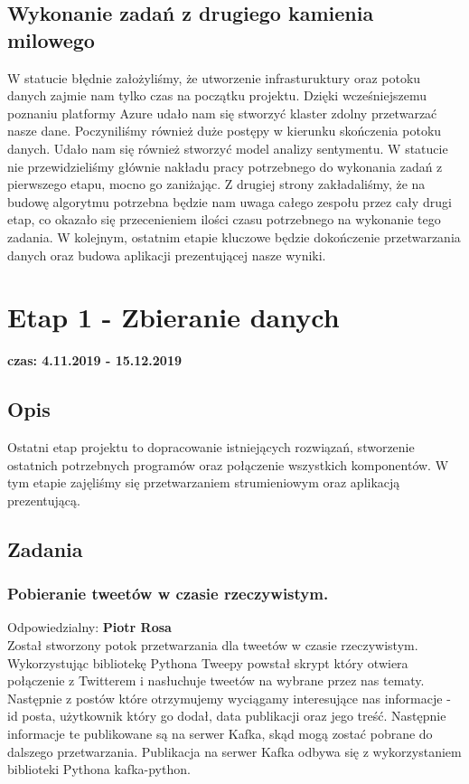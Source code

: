 \documentclass[a4paper,11pt, notitlepage ]{article}
\begin{document}
\subsection{Wykonanie zadań z drugiego kamienia milowego}
W statucie błędnie założyliśmy, że utworzenie infrasturuktury oraz potoku danych zajmie nam tylko czas na początku projektu. Dzięki wcześniejszemu poznaniu platformy Azure udało nam się stworzyć klaster zdolny przetwarzać nasze dane. Poczyniliśmy również duże postępy w kierunku skończenia potoku danych. Udało nam się również stworzyć model analizy sentymentu. W statucie nie przewidzieliśmy głównie nakładu pracy potrzebnego do wykonania zadań z pierwszego etapu, mocno go zaniżając. Z drugiej strony zakładaliśmy, że na budowę algorytmu potrzebna będzie nam uwaga całego zespołu przez cały drugi etap, co okazało się przecenieniem ilości czasu potrzebnego na wykonanie tego zadania. W kolejnym, ostatnim etapie kluczowe będzie dokończenie przetwarzania danych oraz budowa aplikacji prezentującej nasze wyniki.

\section{Etap 1 - Zbieranie danych}
\textbf{czas: 4.11.2019 - 15.12.2019}
\subsection{Opis}
Ostatni etap projektu to dopracowanie istniejących rozwiązań, stworzenie ostatnich potrzebnych programów oraz połączenie wszystkich komponentów. W tym etapie zajęliśmy się przetwarzaniem strumieniowym oraz aplikacją prezentującą.
\subsection{Zadania}
    \subsubsection{Pobieranie tweetów w czasie rzeczywistym.}
    Odpowiedzialny: \textbf{Piotr Rosa}\\
    Został stworzony potok przetwarzania dla tweetów w czasie rzeczywistym. 
    Wykorzystując bibliotekę Pythona Tweepy powstał skrypt który otwiera połączenie z Twitterem i nasłuchuje tweetów na wybrane przez nas tematy. Następnie z postów które otrzymujemy wyciągamy interesujące nas informacje - id posta, użytkownik który go dodał, data publikacji oraz jego treść. Następnie informacje te publikowane są na serwer Kafka, skąd mogą zostać pobrane do dalszego przetwarzania. Publikacja na serwer Kafka odbywa się z wykorzystaniem biblioteki Pythona kafka-python.
    
\end{document}
